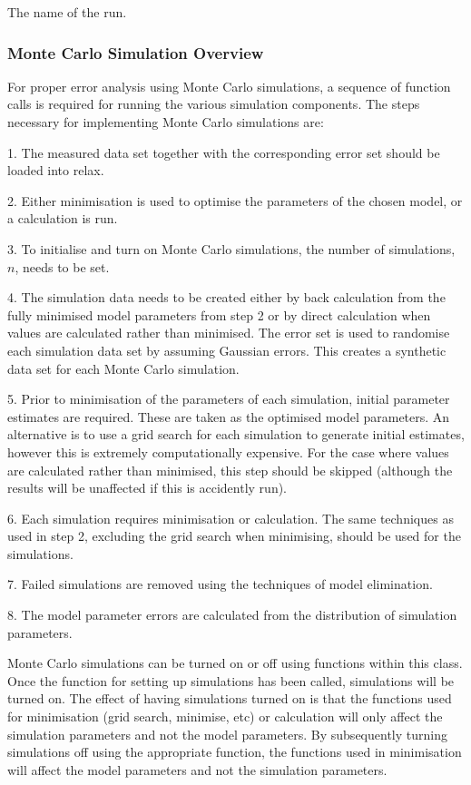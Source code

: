   The name of the run.

\subsubsection{Monte Carlo Simulation Overview}

For proper error analysis using Monte Carlo simulations, a sequence of function calls is
required for running the various simulation components.  The steps necessary for
implementing Monte Carlo simulations are:

1.  The measured data set together with the corresponding error set should be loaded into
relax.

2.  Either minimisation is used to optimise the parameters of the chosen model, or a
calculation is run.

3.  To initialise and turn on Monte Carlo simulations, the number of simulations, $n$, needs
to be set.

4.  The simulation data needs to be created either by back calculation from the fully
minimised model parameters from step 2 or by direct calculation when values are calculated
rather than minimised.  The error set is used to randomise each simulation data set by
assuming Gaussian errors.  This creates a synthetic data set for each Monte Carlo
simulation.

5.  Prior to minimisation of the parameters of each simulation, initial parameter estimates
are required.  These are taken as the optimised model parameters.  An alternative is to use
a grid search for each simulation to generate initial estimates, however this is extremely
computationally expensive.  For the case where values are calculated rather than minimised,
this step should be skipped (although the results will be unaffected if this is accidently
run).

6.  Each simulation requires minimisation or calculation.  The same techniques as used in
step 2, excluding the grid search when minimising, should be used for the simulations.

7.  Failed simulations are removed using the techniques of model elimination.

8.  The model parameter errors are calculated from the distribution of simulation
parameters.


Monte Carlo simulations can be turned on or off using functions within this class.  Once the
function for setting up simulations has been called, simulations will be turned on.  The
effect of having simulations turned on is that the functions used for minimisation (grid
search, minimise, etc) or calculation will only affect the simulation parameters and not the
model parameters.  By subsequently turning simulations off using the appropriate function,
the functions used in minimisation will affect the model parameters and not the simulation
parameters.


